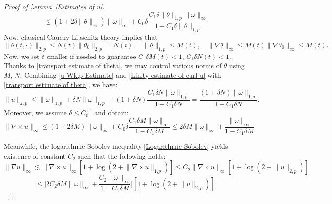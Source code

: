 \documentclass[12pt,letterpaper]{article}
\theoremstyle{plain}
\begin{document}
\begin{proof}[Proof of Lemma~\ref{Estimates of u}]
\begin{equation*}
\end{equation*}
\begin{equation}\label{Linfty estimate of curl u}
 \le    (1+2\delta\lVert\theta \rVert_{\infty})\lVert \omega\rVert_\infty+ C_0\delta \frac{C_1\delta \lVert \theta\rVert_{1,p}\lVert \omega\rVert_{\infty}}{1-C_1\delta \lVert \theta\rVert_{1,p}}
\end{equation}
Now, classical Cauchy-Lipschitz theory implies that
\begin{equation}\label{transport estimate of theta}
 \lVert \theta(t,\cdot)\rVert_{2,p}\le N(t)\lVert \theta_0\rVert_{2,p}=N(t),\quad \lVert\theta\rVert_{1,p}\le M(t),\quad \lVert\nabla\theta\rVert_\infty\le M(t)\lVert\nabla\theta_0\rVert_\infty\le M(t).   
\end{equation}
Now, we set $t$ smaller if needed to guarantee $C_1\delta M(t)<1$, $C_1\delta N(t)<1$. Thanks to \eqref{transport estimate of theta}, we may control various norms of $\theta$ using $M$, $N$. Combining \eqref{u Wk,p Estimate} and \eqref{Linfty estimate of curl u} with \eqref{transport estimate of theta}, we have:
\begin{equation}\label{ u final W2,p estimate}
\lVert u\rVert_{2,p}\le \lVert\omega\rVert_{1,p}+\delta N\lVert\omega\rVert_{1,p}+(1+\delta N)\frac{C_1\delta N\lVert\omega\rVert_{1,p}}{1-C_1\delta N}=\frac{(1+\delta N)\lVert\omega\rVert
_{1,p}}{1-C_1\delta N}.   
\end{equation}
Moreover, we assume $\delta\le C_0^{-1}$ and obtain:
 \begin{equation}\label{ curl u final Linfty estimate}
\lVert \nabla\times u\rVert_\infty\le (1+2\delta M)\lVert\omega\rVert_\infty+C_0\delta\frac{C_1\delta M \lVert\omega\rVert_\infty}{1-C_1\delta M}\le 2\delta M \lVert\omega\rVert_\infty+\frac{\lVert\omega\rVert
_\infty}{1-C_1\delta M}  
\end{equation}


Meanwhile, the logarithmic Sobolev inequality \eqref{Logarithmic Sobolev} yields existence of constant $C_2$ such that the following holds:
\begin{equation*}
 \lVert \nabla u\rVert_\infty\lesssim \lVert\nabla\times u\rVert_\infty[1+\log (2+\lVert\nabla\times u\rVert_{1,p})]\le C_2   \lVert\nabla\times u\rVert_\infty[1+\log (2+\lVert u\rVert_{2,p})]
\end{equation*}
\begin{equation*}
 \le  \Big[2C_2\delta M\lVert\omega\rVert_\infty+\frac{C_2\lVert\omega\rVert_\infty}{1-C_1\delta M}\Big][1+\log (2+\lVert u\rVert_{2,p})].
\end{equation*}


\end{proof}
\end{document}
